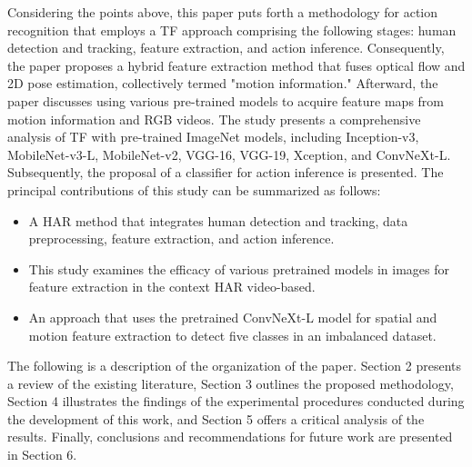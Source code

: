 \documentclass[mathematics,article,submit,pdftex,moreauthors]{Definitions/mdpi}
\begin{document}
Considering the points above, this paper puts forth a methodology for action recognition that employs a TF approach comprising the following stages: human detection and tracking, feature extraction, and action inference. Consequently, the paper proposes a hybrid feature extraction method that fuses optical flow and 2D pose estimation, collectively termed "motion information." Afterward, the paper discusses using various pre-trained models to acquire feature maps from motion information and RGB videos. The study presents a comprehensive analysis of TF with pre-trained ImageNet models, including Inception-v3, MobileNet-v3-L, MobileNet-v2, VGG-16, VGG-19, Xception, and ConvNeXt-L. Subsequently, the proposal of a classifier for action inference is presented. The principal contributions of this study can be summarized as follows:

\begin{itemize}
    \item A HAR method that integrates human detection and tracking, data preprocessing, feature extraction, and action inference.
    \item This study examines the efficacy of various pretrained models in images for feature extraction in the context HAR video-based.
    \item An approach that uses the pretrained ConvNeXt-L model for spatial and motion feature extraction to detect five classes in an imbalanced dataset.
\end{itemize}

The following is a description of the organization of the paper. Section 2 presents a review of the existing literature, Section 3 outlines the proposed methodology, Section 4 illustrates the findings of the experimental procedures conducted during the development of this work, and Section 5 offers a critical analysis of the results. Finally, conclusions and recommendations for future work are presented in Section 6.



\end{document}
